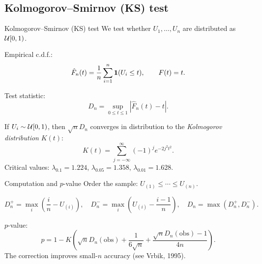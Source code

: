 \documentclass[aspectratio=169]{beamer}
\begin{document}
\subsection{Kolmogorov–Smirnov (KS) test}

\begin{frame}{Kolmogorov–Smirnov (KS) test}
We test whether $U_1,\ldots,U_n$ are distributed as ${\cal U}[0,1)$.

Empirical c.d.f.:
\[
\hat{F}_n(t)=\frac{1}{n}\sum_{i=1}^n \boldsymbol{1}(U_i\le t),
\qquad F(t)=t.
\]

Test statistic:
\[
D_n = \sup_{0\le t\le 1}|\hat{F}_n(t)-t|.
\]

If $U_i\sim{\cal U}[0,1)$, then $\sqrt{n}D_n$ converges in distribution to
the \textsl{Kolmogorov distribution} $K(t)$:
\[
K(t)=\sum_{j=-\infty}^{\infty}(-1)^j e^{-2j^2t^2}.
\]
Critical values:
$\lambda_{0.1}=1.224$, $\lambda_{0.05}=1.358$, $\lambda_{0.01}=1.628$.
\end{frame}

\begin{frame}{Computation and $p$-value}
Order the sample: $U_{(1)}\le\cdots\le U_{(n)}$.

\[
D_n^+ = \max_i\!\left(\frac{i}{n}-U_{(i)}\right), \quad
D_n^- = \max_i\!\left(U_{(i)}-\frac{i-1}{n}\right),
\quad D_n=\max(D_n^+,D_n^-).
\]

$p$-value:
\[
p = 1 - K\!\left(\sqrt{n}D_n(\text{obs})
+ \frac{1}{6\sqrt{n}}
+ \frac{\sqrt{n}D_n(\text{obs})-1}{4n}\right).
\]
The correction improves small-$n$ accuracy
(see Vrbik, 1995).
\end{frame}
\end{document}
